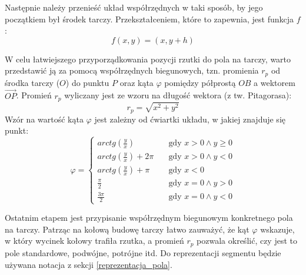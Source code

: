 Następnie należy przenieść układ współrzędnych w taki sposób, by jego początkiem był środek tarczy. Przekształceniem, które to zapewnia, jest funkcja $f$:
$$
f(x, y) = (x, y + h)
$$

W celu łatwiejszego przyporządkowania pozycji rzutki do pola na tarczy, warto przedstawić ją za pomocą współrzędnych biegunowych, tzn. promienia $r_p$ od środka tarczy ($O$) do punktu $P$ oraz kąta $\varphi$ pomiędzy półprostą $OB$ a wektorem $\overrightarrow{OP}$. \newline
Promień $r_p$ wyliczany jest ze wzoru na długość wektora (z tw. Pitagorasa):
$$
r_p = \sqrt{x^2 + y^2}
$$
Wzór na wartość kąta $\varphi$ jest zależny od ćwiartki układu, w jakiej znajduje się punkt:
$$
\varphi = 
     \begin{cases}
       arctg(\frac{y}{x}) &\quad\text{gdy } x > 0 \land y \ge 0 \\
       arctg(\frac{y}{x}) + 2\pi &\quad\text{gdy } x > 0 \land y < 0 \\
       arctg(\frac{y}{x})+ \pi &\quad\text{gdy } x < 0 \\
       \frac{\pi}{2} &\quad\text{gdy } x = 0 \land y > 0 \\ 
       \frac{3\pi}{2} &\quad\text{gdy } x = 0 \land y < 0
     \end{cases}
$$

Ostatnim etapem jest przypisanie współrzędnym biegunowym konkretnego pola na tarczy. Patrząc na kołową budowę tarczy łatwo zauważyć, że kąt $\varphi$ wskazuje, w który wycinek kołowy trafiła rzutka, a promień $r_p$ pozwala określić, czy jest to pole standardowe, podwójne, potrójne itd. Do reprezentacji segmentu będzie używana notacja z sekcji \ref{reprezentacja_pola}.